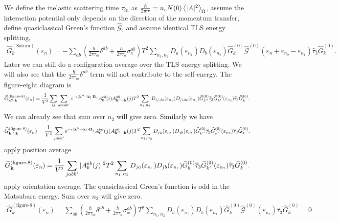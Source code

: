 \documentclass[]{article}
\begin{document}
We define the inelastic scattering time $\tau_{in}$ as $\frac{\hbar}{2\pi\tau}=n_sN(0)\ev{|A|^2}_\Omega$,
assume the interaction potential only depends on the direction of the momentum transfer,
define quasiclassical Green's function $\widehat{\mathcal{G}}$, and assume identical TLS energy splitting,
\begin{align}
    \widehat{G}^{(\text{Saturn})}_{k}(\varepsilon_n)
    = -\sum_{ab}
    \left(\frac{\hbar}{2\pi\tau_m}\delta^{ab} + \frac{\hbar}{2\pi\tau_n}\sigma_x^{ab}\right)
    T^2\sum_{n_1,n_2}
    D_a(\varepsilon_{n_1})D_b(\varepsilon_{n_2})
    \widehat{G}^{(0)}_k
    \widehat{\mathcal{G}}^{(0)}(\varepsilon_n+\varepsilon_{n_2}-\varepsilon_{n_1})
    \widehat{\tau}_3
    \widehat{G}^{(0)}_k.
\end{align}
Later we can still do a configuration average over the TLS energy splitting.
We will also see that the $\frac{\hbar}{2\pi\tau_m}\delta^{ab}$ term will not contribute to the self-energy.
The figure-eight diagram is
\begin{align}
    \widehat{G}^{(\text{figure-8})}_{\vb{k}'',\vb{k}}(\varepsilon_n)
    =\frac{1}{V^2}\sum_{ij}\sum_{abcdk'}
    e^{-i(\vb{k}''-\vb{k})\cdot\vb{R}_j}
    A_0^{cd}(i) A_{\vb{k}''-\vb{k}}^{ab}(j)
    T^2\sum_{n_1,n_2}
    D_{ij,da}(\varepsilon_{n_1})D_{ji,bc}(\varepsilon_{n_1})
    \widehat{G}^{(0)}_{k''}\widehat{\tau}_3
    \widehat{G}^{(0)}_{k'}(\varepsilon_{n_2})
    \widehat{\tau}_3
    \widehat{G}^{(0)}_k.
\end{align}
We can already see that sum over $n_2$ will give zero.
Similarly we have
\begin{align}
    \widehat{G}^{(\text{figure-8})}_{\vb{k}'',\vb{k}}(\varepsilon_n)
    =\frac{1}{V^2}\sum_{jabk'}
    e^{-i(\vb{k}''-\vb{k})\cdot\vb{R}_j}
    A_0^{ba}(j) A_{\vb{k}''-\vb{k}}^{ab}(j)
    T^2\sum_{n_1,n_2}
    D_{ja}(\varepsilon_{n_1})D_{jb}(\varepsilon_{n_1})
    \widehat{G}^{(0)}_{k''}\widehat{\tau}_3
    \widehat{G}^{(0)}_{k'}(\varepsilon_{n_2})
    \widehat{\tau}_3
    \widehat{G}^{(0)}_k.
\end{align}
apply position average
\begin{align}
    \widehat{G}^{(\text{figure-8})}_{\vb{k}}(\varepsilon_n)
    =\frac{1}{V^2}\sum_{jabk'}
    |A_0^{ab}(j)|^2
    T^2\sum_{n_1,n_2}
    D_{ja}(\varepsilon_{n_1})D_{jb}(\varepsilon_{n_1})
    \widehat{G}^{(0)}_k\widehat{\tau}_3
    \widehat{G}^{(0)}_{k'}(\varepsilon_{n_2})
    \widehat{\tau}_3
    \widehat{G}^{(0)}_k.
\end{align}
apply orientation average.
The quasiclassical Green's function is odd in the Matsubara energy.
Sum over $n_2$ will give zero.
\begin{align}
    \widehat{G}^{(\text{figure-8})}_k(\varepsilon_n)
    =\sum_{ab}
    \left(\frac{\hbar}{2\pi\tau_m}\delta^{ab} + \frac{\hbar}{2\pi\tau_n}\sigma_x^{ab}\right)
    T^2\sum_{n_1,n_2}
    D_a(\varepsilon_{n_1})D_b(\varepsilon_{n_1})
    \widehat{G}^{(0)}_k
    \widehat{\mathcal{G}}^{(0)}(\varepsilon_{n_2})
    \widehat{\tau}_3
    \widehat{G}^{(0)}_k = 0
\end{align}
\end{document}
